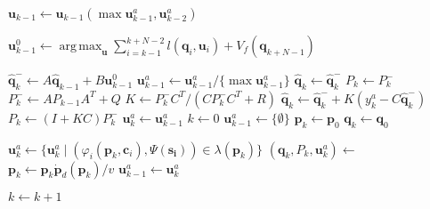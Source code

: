 \documentclass[letterpaper,10pt,conference]{ieeeconf}
\DeclarePairedDelimiter\abs{\lvert}{\rvert}%
\theoremstyle{definition}
\DeclareMathOperator*{\argmax}{arg\,max}
\begin{document}
\begin{algorithmic}[1]
  \label{alg:step}
  
  \State $\mathbf{u}_{k-1}\gets {\mathbf{u}_{k-1}(\max{\mathbf{u}}_{k-1}^a,\mathbf{u}_{k-2}^a)}$\label{alg:max_cont_sequence}

  \State $\mathbf{u}^0_{k-1}\gets\argmax_{\mathbf{u}}{\sum_{i=k-1}^{k+N-2}{l(\mathbf{q}_i,\mathbf{u}_i)+V_f(\mathbf{q}_{k+N-1})}}$\label{alg:mpc}

  \State $\hat{\mathbf{q}}_k^-\gets A\hat{\mathbf{q}}_{k-1} + B\mathbf{u}^0_{k-1}$
  \label{alg:output_constraints}
    \State $\mathbf{u}^a_{k-1}\gets\mathbf{u}^a_{k-1}/\{\max{\mathbf{u}}^a_{k-1}\}$
    \State{}\label{alg:recursion}
  \Else
      \State $\hat{\mathbf{q}}_k\gets\hat{\mathbf{q}}_k^-$\label{alg:evolution}
      \State $P_k\gets P_k^-$
    \Else 
      \State $P_k^-\gets AP_{k-1}A^T+Q$\label{alg:kalman_start}
      \State $K\gets P_k^-C^T/(CP_k^-C^T+R)$
      \State $\hat{\mathbf{q}}_k\gets \hat{\mathbf{q}}_k^-+K(y_k^a-C\hat{\mathbf{q}}_k^-)$
      \State $P_k\gets(I+KC)P_k^-$\label{alg:kalman_end}
    \EndIf
    \State $\mathbf{u}_{k}^a\gets \mathbf{u}_{k-1}^a$
    \State{}
  \EndIf
  \EndProcedure
\vspace*{1ex}
  \State $k\gets 0$
  \State $\mathbf{u}_{k-1}^a\gets\{\emptyset\}$
  \State $\mathbf{p}_k\gets\mathbf{p}_0$
  \State $\mathbf{q}_k\gets\mathbf{q}_0$
    
    \State $\mathbf{u}_{k}^a\gets \{\mathbf{u}_{k}^a\mid(\varphi_i(\mathbf{p}_{k},\mathbf{c}_{i}),\Psi(\mathbf{s_{i}}))\in\lambda(\mathbf{p}_k)\}$
    \State $(\mathbf{q}_k,P_k,\mathbf{u}_k^a)\gets$\label{alg:en}
    \State $\mathbf{p}_{k}\gets\mathbf{p}_k\dot{\mathbf{p}}_d(\mathbf{p}_k)/v$\label{alg:pos}
    \State $\mathbf{u}_{k-1}^a\gets\mathbf{u}_{k}^a$

    \State $k\gets k + 1$
  \EndWhile 
  \EndProcedure
\end{algorithmic}
\end{document}
